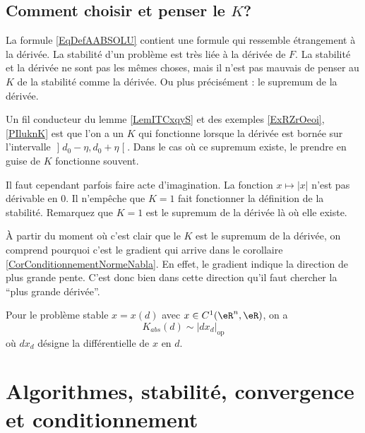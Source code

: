 \subsection{Comment choisir et penser le $K$?}

La formule \eqref{EqDefAABSOLU} contient une formule qui ressemble étrangement à la dérivée. La stabilité d'un problème est très liée à la dérivée de $F$. La stabilité et la dérivée ne sont pas les mêmes choses, mais il n'est pas mauvais de penser au $K$ de la stabilité comme la dérivée. Ou plus précisément : le supremum de la dérivée.

Un fil conducteur du lemme \ref{LemITCxqyS} et des exemples \ref{ExRZrOeoi}, \ref{PIluknK} est que l'on a un $K$ qui fonctionne lorsque la dérivée est bornée sur l'intervalle $\mathopen] d_0-\eta , d_0+\eta \mathclose[$. Dans le cas où ce supremum existe, le prendre en guise de $K$ fonctionne souvent.

Il faut cependant parfois faire acte d'imagination. La fonction $x\mapsto| x |$ n'est pas dérivable en $0$. Il n'empêche que $K=1$ fait fonctionner la définition de la stabilité. Remarquez que $K=1$ est le supremum de la dérivée là où elle existe.

À partir du moment où c'est clair que le $K$ est le supremum de la dérivée, on comprend pourquoi c'est le gradient qui arrive dans le corollaire \ref{CorConditionnementNormeNabla}. En effet, le gradient indique la direction de plus grande pente. C'est donc bien dans cette direction qu'il faut chercher la ``plus grande dérivée''.

\begin{proposition}
	Pour le problème stable $x=x(d)$ avec $x\in C^1(\eR^n,\eR)$, on a
	\begin{equation}
		K_{abs}(d)\sim|dx_d|_{\mbox{op}}
	\end{equation}
	où \( dx_d\) désigne la différentielle de $x$ en $d$.
\end{proposition}

\section{Algorithmes, stabilité, convergence et conditionnement}

